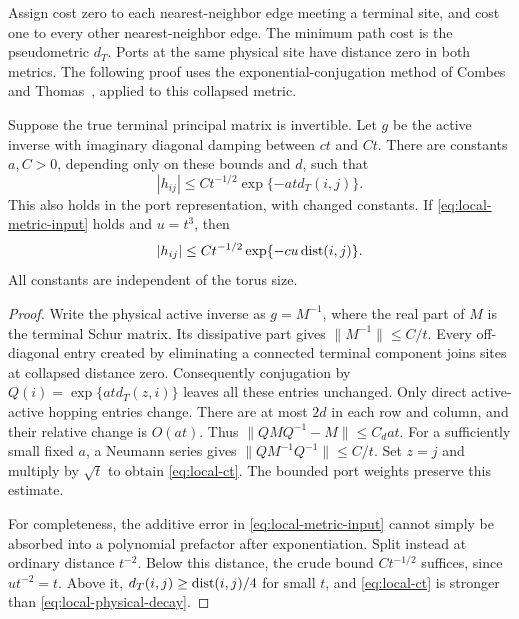 Assign cost zero to each nearest-neighbor edge meeting a terminal site,
and cost one to every other nearest-neighbor edge.  The minimum path
cost is the pseudometric \(d_T\).  Ports at the same physical site have
distance zero in both metrics.
The following proof uses the exponential-conjugation method of Combes
and Thomas~\cite{CombesThomas1973}, applied to this collapsed metric.

\begin{lemma}\label{lem:locality}
Suppose the true terminal principal matrix is invertible.  Let \(g\)
be the active inverse with imaginary diagonal damping between \(ct\)
and \(Ct\).  There are constants \(a,C>0\), depending only on these
bounds and \(d\), such that
\begin{equation}\label{eq:local-ct}
 |h_{ij}|\le Ct^{-1/2}\exp\{-atd_T(i,j)\}.
\end{equation}
This also holds in the port representation, with changed constants.
If \eqref{eq:local-metric-input} holds and \(u=t^3\), then
\begin{equation}\label{eq:local-physical-decay}
 |h_{ij}|\le Ct^{-1/2}\exp\{-cu\operatorname{dist}(i,j)\}.
\end{equation}
All constants are independent of the torus size.
\end{lemma}

\begin{proof}
Write the physical active inverse as \(g=M^{-1}\), where the real part
of \(M\) is the terminal Schur matrix.  Its dissipative part gives
\(\|M^{-1}\|\le C/t\).  Every off-diagonal entry created by eliminating
a connected terminal component joins sites at collapsed distance zero.
Consequently conjugation by
\(Q(i)=\exp\{atd_T(z,i)\}\) leaves all these entries unchanged.
Only direct active-active hopping entries change.  There are at most
\(2d\) in each row and column, and their relative change is \(O(at)\).
Thus \(\|QMQ^{-1}-M\|\le C_d at\).  For a sufficiently small fixed \(a\),
a Neumann series gives
\(\|QM^{-1}Q^{-1}\|\le C/t\).  Set \(z=j\) and multiply by
\(\sqrt t\) to obtain \eqref{eq:local-ct}.  The bounded port weights
preserve this estimate.

For completeness, the additive error in
\eqref{eq:local-metric-input} cannot simply be absorbed into a
polynomial prefactor after exponentiation.  Split instead at ordinary
distance \(t^{-2}\).  Below this distance, the crude bound
\(Ct^{-1/2}\) suffices, since \(u t^{-2}=t\).  Above it,
\(d_T(i,j)\ge\operatorname{dist}(i,j)/4\) for small \(t\), and
\eqref{eq:local-ct} is stronger than
\eqref{eq:local-physical-decay}.
\end{proof}

